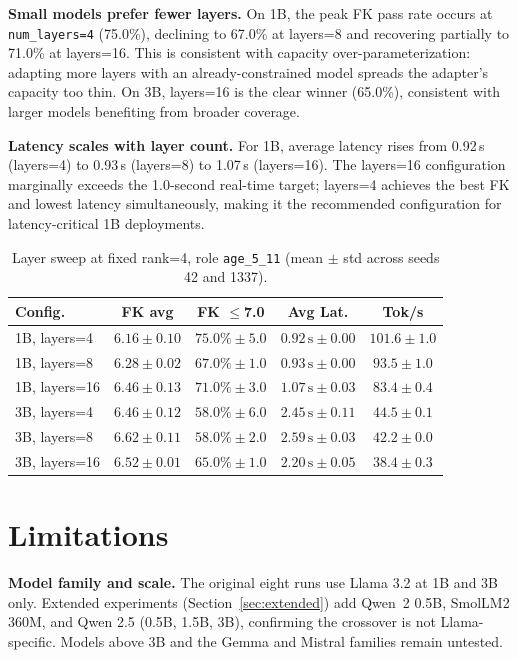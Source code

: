 \documentclass[ASNA,twocolumn]{USG} %
\begin{document}
\textbf{Small models prefer fewer layers.} On 1B, the peak FK pass rate occurs at \texttt{num\_layers=4} (75.0\%), declining to 67.0\% at layers=8 and recovering partially to 71.0\% at layers=16. This is consistent with capacity over-parameterization: adapting more layers with an already-constrained model spreads the adapter's capacity too thin. On 3B, layers=16 is the clear winner (65.0\%), consistent with larger models benefiting from broader coverage.

\textbf{Latency scales with layer count.} For 1B, average latency rises from 0.92\,s (layers=4) to 0.93\,s (layers=8) to 1.07\,s (layers=16). The layers=16 configuration marginally exceeds the 1.0-second real-time target; layers=4 achieves the best FK and lowest latency simultaneously, making it the recommended configuration for latency-critical 1B deployments.

\begin{table}[!t]
  \centering
  \caption{Layer sweep at fixed rank=4, role \texttt{age\_5\_11} (mean $\pm$ std across seeds 42 and 1337).}
  \label{tab:layersweep}
  \small
  \begin{tabular}{lcccc}
    \hline
    Config. & FK avg & FK $\leq$7.0 & Avg Lat. & Tok/s \\
    \hline
    1B, layers=4  & $6.16 \pm 0.10$ & $75.0\% \pm 5.0$ & $0.92\,\text{s} \pm 0.00$ & $101.6 \pm 1.0$ \\
    1B, layers=8  & $6.28 \pm 0.02$ & $67.0\% \pm 1.0$ & $0.93\,\text{s} \pm 0.00$ & $93.5 \pm 1.0$  \\
    1B, layers=16 & $6.46 \pm 0.13$ & $71.0\% \pm 3.0$ & $1.07\,\text{s} \pm 0.03$ & $83.4 \pm 0.4$  \\
    3B, layers=4  & $6.46 \pm 0.12$ & $58.0\% \pm 6.0$ & $2.45\,\text{s} \pm 0.11$ & $44.5 \pm 0.1$  \\
    3B, layers=8  & $6.62 \pm 0.11$ & $58.0\% \pm 2.0$ & $2.59\,\text{s} \pm 0.03$ & $42.2 \pm 0.0$  \\
    3B, layers=16 & $6.52 \pm 0.01$ & $65.0\% \pm 1.0$ & $2.20\,\text{s} \pm 0.05$ & $38.4 \pm 0.3$  \\
    \hline
  \end{tabular}
\end{table}

\section{Limitations}\label{sec:limitations}

\textbf{Model family and scale.} The original eight runs use Llama 3.2 at 1B and 3B only. Extended experiments (Section~\ref{sec:extended}) add Qwen~2 0.5B, SmolLM2 360M, and Qwen 2.5 (0.5B, 1.5B, 3B), confirming the crossover is not Llama-specific. Models above 3B and the Gemma and Mistral families remain untested.
\end{document}
